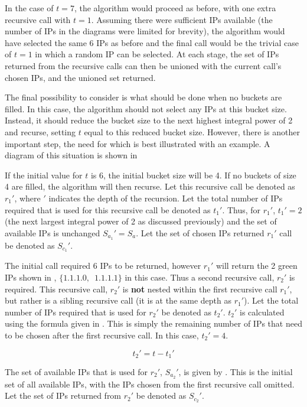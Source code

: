 In the case of $t = 7$, the algorithm would proceed as before, with one extra recursive call with $t = 1$. Assuming there were sufficient IPs available (the number of IPs in the diagrams were limited for brevity), the algorithm would have selected the same 6 IPs as before and the final call would be the trivial case of $t = 1$ in which a random IP can be selected. At each stage, the set of IPs returned from the recursive calls can then be unioned with the current call's chosen IPs, and the unioned set returned. 

The final possibility to consider is what should be done when no buckets are filled. In this case, the algorithm should not select any IPs at this bucket size. Instead, it should reduce the bucket size to the next highest integral power of 2 and recurse, setting $t$ equal to this reduced bucket size. However, there is another important step, the need for which is best illustrated with an example. A diagram of this situation is shown in 

If the initial value for $t$ is 6, the initial bucket size will be 4. If no buckets of size 4 are filled, the algorithm will then recurse. Let this recursive call be denoted as $r_1'$, where $'$ indicates the depth of the recursion. Let the total number of IPs required that is used for this recursive call be denoted as $t_1'$. Thus, for $r_1'$, $t_1' = 2$ (the next largest integral power of 2 as discussed previously) and the set of available IPs is unchanged $S_{a_1}' = S_a$. Let the set of chosen IPs returned $r_1'$ call be denoted as $S_{c_1}'$.

The initial call required 6 IPs to be returned, however $r_1'$ will return the 2 green IPs shown in , $\{1.1.1.0,\enspace1.1.1.1\}$ in this case. Thus a second recursive call, $r_2'$ is required. This recursive call, $r_2'$ is \textbf{not} nested within the first recursive call $r_1'$, but rather is a sibling recursive call (it is at the same depth as $r_1'$).  Let the total number of IPs required that is used for $r_2'$ be denoted as $t_2'$. $t_2'$ is calculated using the formula given in . This is simply the remaining number of IPs that need to be chosen after the first recursive call. In this case, $t_2' = 4$. 

\begin{equation}\label{eq:secondRecurseT2}
t_2' = t - t_1'
\end{equation}

The set of available IPs that is used for $r_2'$, $S_{a_2}'$, is given by . This is the initial set of all available IPs, with the IPs chosen from the first recursive call omitted. Let the set of IPs returned from $r_2'$ be denoted as $S_{c_2}'$.

